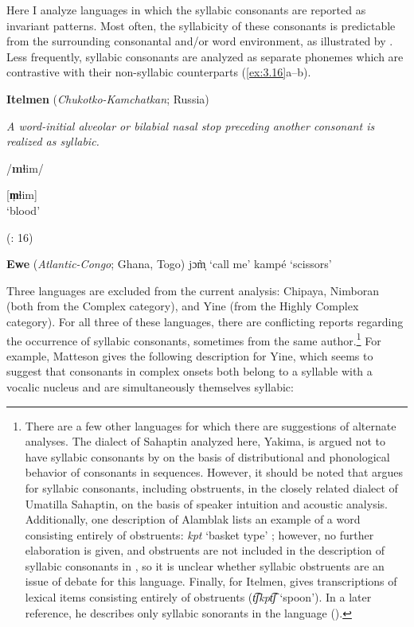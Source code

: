   Here I analyze languages in which the syllabic consonants are reported as invariant patterns. Most often, the syllabicity of these consonants is predictable from the surrounding consonantal and/or word environment, as illustrated by . Less frequently, syllabic consonants are analyzed as separate phonemes which are contrastive with their non-syllabic counterparts (\ref{ex:3.16}a--b).

\ea\label{ex:3.15}
  \textbf{Itelmen} (\textit{Chukotko-Kamchatkan}; Russia)

\textit{A word-initial alveolar or bilabial nasal stop preceding another consonant is realized as syllabic.}

/\textbf{m}ɬim/

[\textbf{m̩}ɬim]\\
\glt ‘blood’

(\citealt{GeorgVolodin1999}: 16)
\z

\ea\label{ex:3.16}
  \textbf{Ewe} (\textit{Atlantic-Congo}; Ghana, Togo)
\ea   jɔm̩̀
\glt  ‘call me’
\ex kampé
\glt  ‘scissors’
\citep[38]{Ameka1991}
\z
\z

  Three languages are excluded from the current analysis: Chipaya, Nimboran (both from the Complex category), and Yine (from the Highly Complex category). For all three of these languages, there are conflicting reports regarding the occurrence of syllabic consonants, sometimes from the same author.\footnote{{There are a few other languages for which there are suggestions of alternate analyses. The dialect of Sahaptin analyzed here, Yakima, is argued not to have syllabic consonants by \citet{HargusBeavert2006} on the basis of distributional and phonological behavior of consonants in sequences. However, it should be noted that \citet{Minthorn2005} argues for syllabic consonants, including obstruents, in the closely related dialect of Umatilla Sahaptin, on the basis of speaker intuition and acoustic analysis. Additionally, one description of Alamblak lists an example of a word consisting entirely of obstruents:} \textrm{\textit{kpt}} \textrm{‘basket type’ \citep[1]{EdmistonEdmiston2003}; however, no further elaboration is given, and obstruents are not included in the description of syllabic consonants in \citet{Bruce1984}, so it is unclear whether syllabic obstruents are an issue of debate for this language. Finally, for Itelmen, \citet[42]{Volodin1976} gives transcriptions of lexical items consisting entirely of obstruents (}\textrm{\textit{t͡ʃkpt͡ʃ} }\textrm{‘spoon’). In a later reference, he describes only syllabic sonorants in the language (\citealt{GeorgVolodin1999}).}} For example, Matteson gives the following description for Yine, which seems to suggest that consonants in complex onsets both belong to a syllable with a vocalic nucleus and are simultaneously themselves syllabic:

